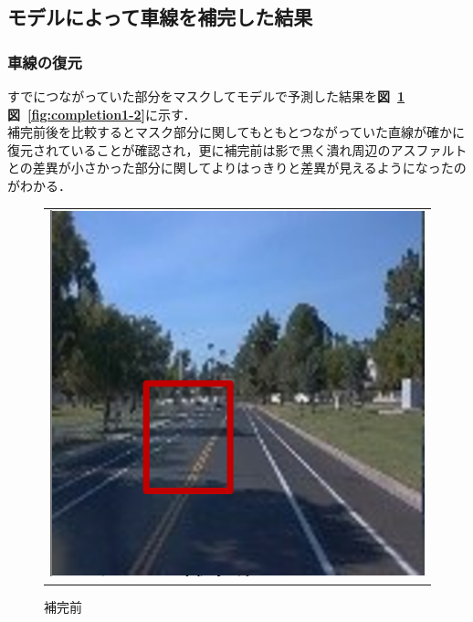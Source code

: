 \documentclass[a4j, 11pt]{jreport}
\newcommand{\figref}[1]{\textbf{図~\ref{#1}}}
\begin{document}
\subsection{モデルによって車線を補完した結果}
\subsubsection{車線の復元}
すでにつながっていた部分をマスクしてモデルで予測した結果を\figref{fig:completion1-1}\figref{fig:completion1-2}に示す．\\
補完前後を比較するとマスク部分に関してもともとつながっていた直線が確かに復元されていることが確認され，更に補完前は影で黒く潰れ周辺のアスファルトとの差異が小さかった部分に関してよりはっきりと差異が見えるようになったのがわかる．
\begin{figure}[H]
	\centering
	  \begin{tabular}{c}
		\begin{minipage}{0.50\hsize}
		  \centering
			\includegraphics[scale=0.5]
			{images/result/completion/result1-1.png}
			\caption{補完前}
			\label{fig:completion1-1}
		\end{minipage}
   

\end{tabular}
\end{figure}
\end{document}
